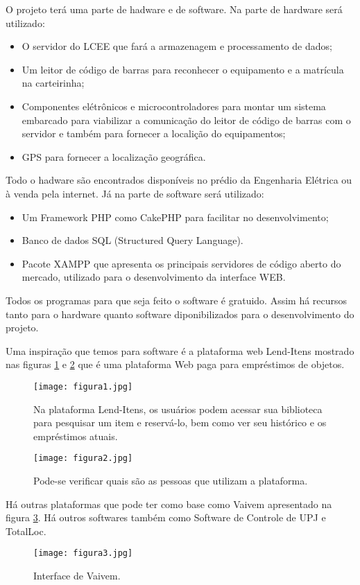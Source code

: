 \vspace{-42pt}

O projeto terá uma parte de hadware e de software. Na parte de hardware será utilizado:
\begin{itemize}
   \item O servidor do LCEE que fará a armazenagem e processamento de dados; 
   \item Um leitor de código de barras para reconhecer o equipamento e a matrícula na carteirinha;
   \item Componentes elétrônicos e microcontroladores para montar um sistema embarcado para viabilizar a comunicação do leitor de código de barras com o servidor e também para fornecer a localição do equipamentos;
   \item GPS para fornecer a localização geográfica.
\end{itemize}
Todo o hadware são encontrados disponíveis no prédio da Engenharia Elétrica ou à venda pela internet. Já na parte de software será utilizado:
\begin{itemize}
   \item Um Framework PHP como CakePHP para facilitar no desenvolvimento; 
   \item Banco de dados SQL (Structured Query Language).
   \item Pacote XAMPP que apresenta os principais servidores de código aberto do mercado, utilizado para o desenvolvimento da interface WEB.
\end{itemize}

Todos os programas para que seja feito o software é gratuido. Assim há recursos tanto para o hardware quanto software diponibilizados para o desenvolvimento do projeto.

Uma inspiração que temos para software é a plataforma web Lend-Itens mostrado nas figuras \ref{fig:Lend-Itens1} e \ref{fig:Lend-Itens2} que é uma plataforma Web paga para empréstimos de objetos.

\begin{figure}[!h]
	\centering
	\caption{Na plataforma Lend-Itens, os usuários podem acessar sua biblioteca para pesquisar um item e reservá-lo, bem como ver seu histórico e os empréstimos atuais.}
	\texttt{[image: figura1.jpg]}
	\label{fig:Lend-Itens1}
\end{figure}

\begin{figure}[!h]
	\centering
	\caption{Pode-se verificar quais são as pessoas que utilizam a plataforma.}
	\texttt{[image: figura2.jpg]}
	\label{fig:Lend-Itens2}
\end{figure}

Há outras plataformas que pode ter como base como Vaivem apresentado na figura \ref{fig:Vaivem}. Há outros softwares também como Software de Controle de UPJ e TotalLoc.

\begin{figure}[!h]
	\centering
	\caption{Interface de Vaivem.}
	\texttt{[image: figura3.jpg]}
	\label{fig:Vaivem}
\end{figure}

